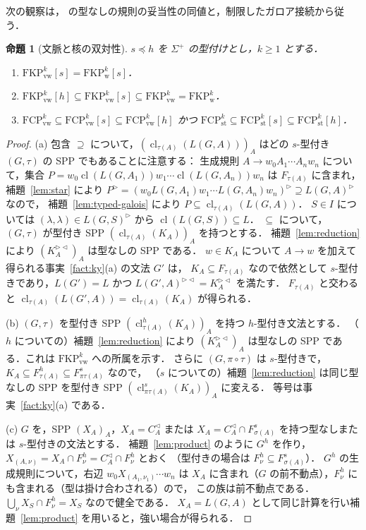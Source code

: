 \documentclass[11pt,a4paper]{ltjsarticle}
\numberwithin{equation}{section}
\theoremstyle{plain}
\newtheorem{proposition}[theorem]{命題}
\theoremstyle{definition}
\theoremstyle{remark}
\theoremstyle{plain}
\newcommand{\eps}{\lambda}
\newcommand{\R}{^{\rhd}}
\newcommand{\Lc}{^{\lhd}}
\newcommand{\RL}{^{\rhd\lhd}}
\newcommand{\cl}{\operatorname{cl}}
\newcommand{\FCP}[2]{\mathrm{FCP}^{#1}_{\mathrm{#2}}}
\newcommand{\FKP}[2]{\mathrm{FKP}^{#1}_{\mathrm{#2}}}
\newcommand{\tFCP}[3]{\mathrm{FCP}^{#1}_{\mathrm{#2}}[#3]}
\newcommand{\tFKP}[3]{\mathrm{FKP}^{#1}_{\mathrm{#2}}[#3]}
\begin{document}
次の観察は，\citet[Sec.~4]{ky2017} の型なしの規則の妥当性の同値と，制限したガロア接続から従う．
\begin{proposition}[文脈と核の双対性]\label{prop:duality}
$s\preceq h$ を $\Sigma^+$ の型付けとし，$k\ge1$ とする．
\begin{enumerate}[label=\textup{(\alph*)},nosep]
\item $\tFKP{k}{vw}{s}=\tFKP{k}{w}{s}$．
\item $\tFKP{k}{vw}{h}\subseteq\tFKP{k}{vw}{s}\subseteq\FKP{k}{vw}=\FKP{k}{w}$．
\item $\FCP{k}{vw}\subseteq\tFCP{k}{vw}{s}\subseteq\tFCP{k}{vw}{h}$ かつ
$\FCP{k}{st}\subseteq\tFCP{k}{st}{s}\subseteq\tFCP{k}{st}{h}$．
\end{enumerate}
\end{proposition}
\begin{proof}
(a) 包含 $\supseteq$ について，$(\cl_{\tau(A)}(L(G,A)))_A$ はどの $s$-型付き $(G,\tau)$ の SPP でもあることに注意する：
生成規則 $A\to w_0A_1\cdots A_nw_n$ について，集合 $P=w_0\cl(L(G,A_1))w_1\cdots\cl(L(G,A_n))w_n$ は $F_{\tau(A)}$ に含まれ，
補題~\ref{lem:star} により $P\R=(w_0L(G,A_1)w_1\cdots L(G,A_n)w_n)\R\supseteq L(G,A)\R$ なので，
補題~\ref{lem:typed-galois} により $P\subseteq\cl_{\tau(A)}(L(G,A))$．
$S\in I$ については $(\eps,\eps)\in L(G,S)\R$ から $\cl(L(G,S))\subseteq L$．
$\subseteq$ について，$(G,\tau)$ が型付き SPP $(\cl_{\tau(A)}(K_A))_A$ を持つとする．
補題~\ref{lem:reduction} により $(K_A\RL)_A$ は型なしの SPP である．
$w\in K_A$ について $A\to w$ を加えて得られる事実~\ref{fact:ky}(a) の文法 $G'$ は，
$K_A\subseteq F_{\tau(A)}$ なので依然として $s$-型付きであり，$L(G')=L$ かつ $L(G',A)\RL=K_A\RL$ を満たす．
$F_{\tau(A)}$ と交わると $\cl_{\tau(A)}(L(G',A))=\cl_{\tau(A)}(K_A)$ が得られる．

(b) $(G,\tau)$ を型付き SPP $(\cl^h_{\tau(A)}(K_A))_A$ を持つ $h$-型付き文法とする．
（$h$ についての）補題~\ref{lem:reduction} により $(K_A\RL)_A$ は型なしの SPP である．これは $\FKP{k}{vw}$ への所属を示す．
さらに $(G,\pi\circ\tau)$ は $s$-型付きで，$K_A\subseteq F^h_{\tau(A)}\subseteq F^s_{\pi\tau(A)}$ なので，
（$s$ についての）補題~\ref{lem:reduction} は同じ型なしの SPP を型付き SPP $(\cl^s_{\pi\tau(A)}(K_A))_A$ に変える．
等号は事実~\ref{fact:ky}(a) である．

(c) $G$ を，SPP $(X_A)_A$，$X_A=C_A\Lc$ または $X_A=C_A\Lc\cap F^s_{\sigma(A)}$ を持つ型なしまたは $s$-型付きの文法とする．
補題~\ref{lem:product} のように $G^h$ を作り，$X_{(A,\nu)}=X_A\cap F^h_\nu=C_A\Lc\cap F^h_\nu$ とおく
（型付きの場合は $F^h_\nu\subseteq F^s_{\sigma(A)}$）．
$G^h$ の生成規則について，右辺 $w_0X_{(A_1,\nu_1)}\cdots w_n$ は $X_A$ に含まれ（$G$ の前不動点），$F^h_\nu$ にも含まれる（型は掛け合わされる）ので，
この族は前不動点である．$\bigcup_\nu X_S\cap F^h_\nu=X_S$ なので健全である．
$X_A=L(G,A)$ として同じ計算を行い補題~\ref{lem:product} を用いると，強い場合が得られる．
\end{proof}
\end{document}
